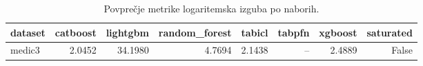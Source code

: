 \begin{table}[htbp]
\centering
\caption{Povprečje metrike logaritemska izguba po naborih.}
\label{tab:pivot}
\begin{tabular}{lrrrrrrr}
\hline
dataset & catboost & lightgbm & random\_forest & tabicl & tabpfn & xgboost & saturated \\
\hline
medic3 & 2.0452 & 34.1980 & 4.7694 & 2.1438 & -- & 2.4889 & False \\
\hline
\end{tabular}
\end{table}
